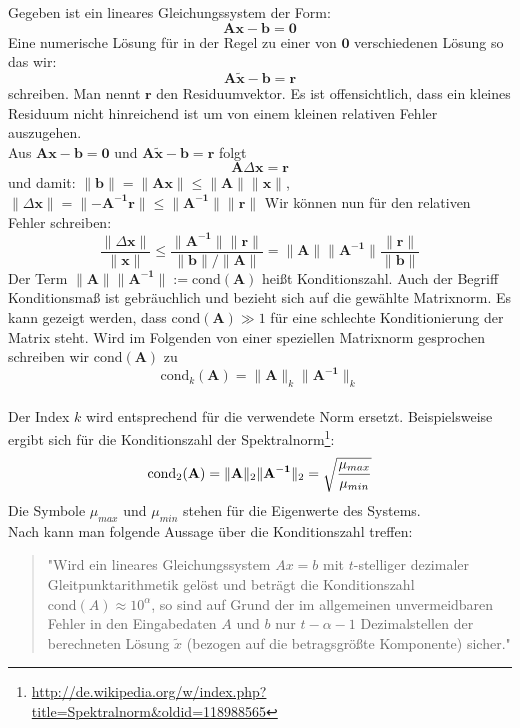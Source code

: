 %
Gegeben ist ein lineares Gleichungssystem der Form:
$$ \mathbf{A}\mathbf{x}-\mathbf{b} =\mathbf{0} $$
Eine numerische Lösung für in der Regel zu einer von $\mathbf{0}$ verschiedenen Lösung so das wir:
$$ \mathbf{A}\mathbf{\tilde{x}}-\mathbf{b} =\mathbf{r} $$
schreiben. Man nennt $\mathbf{r}$ den Residuumvektor. Es ist offensichtlich, dass ein kleines Residuum nicht hinreichend ist um von einem kleinen relativen Fehler auszugehen.\\
Aus $\mathbf{A}\mathbf{x}-\mathbf{b} =\mathbf{0}$ und $\mathbf{A}\mathbf{\tilde{x}}-\mathbf{b} =\mathbf{r}$ folgt $$ \mathbf{A}\Delta\mathbf{x}=\mathbf{r}$$
und damit:
$ 
\lVert \mathbf{b} \rVert=\lVert \mathbf{Ax} \rVert \leq \lVert \mathbf{A} \rVert \lVert \mathbf{x} \rVert
$, 
$
\lVert \Delta\mathbf{x} \rVert=\lVert -\mathbf{A^{-1}r} \rVert \leq \lVert \mathbf{A^{-1}} \rVert \lVert \mathbf{r} \rVert
$
Wir können nun für den relativen Fehler schreiben:
$$
\frac{\lVert \Delta\mathbf{x} \rVert}{\lVert \mathbf{x} \rVert} \leq 
\frac{\lVert \mathbf{A^{-1}} \rVert \lVert \mathbf{r} \rVert}{\lVert \mathbf{b} \rVert / \lVert \mathbf{A} \rVert} =
\lVert \mathbf{A} \rVert \lVert \mathbf{A^{-1}} \rVert \frac{\lVert \mathbf{r} \rVert}{\lVert \mathbf{b} \rVert}
$$
Der Term $\lVert \mathbf{A} \rVert \lVert \mathbf{A^{-1}} \rVert := \text{cond}(\mathbf{A})$ heißt Konditionszahl. Auch der Begriff Konditionsmaß ist gebräuchlich und bezieht sich auf die gewählte Matrixnorm.
Es kann gezeigt werden, dass $\text{cond}(\mathbf{A}) \gg 1$  für eine schlechte Konditionierung der Matrix steht. Wird im Folgenden von einer speziellen Matrixnorm gesprochen schreiben wir $\text{cond}(\mathbf{A})$ zu 
$$ 
\text{cond}_k(\mathbf{A}) = \lVert \mathbf{A} \rVert_k \lVert \mathbf{A^{-1}} \rVert_k
$$ \\
Der Index $k$ wird entsprechend für die verwendete Norm ersetzt. Beispielsweise ergibt sich für die Konditionszahl der Spektralnorm\footnote{\url{http://de.wikipedia.org/w/index.php?title=Spektralnorm&oldid=118988565}}:
$$ 
\text{cond}_2(\mathbf{A}) = \lVert \mathbf{A} \rVert_2 \lVert \mathbf{A^{-1}} \rVert_2=
\sqrt{\frac{\mu_{max}}{\mu_{min}}}\\
$$
Die Symbole $\mu_{max}$ und $\mu_{min}$ stehen für die Eigenwerte des Systems.\\
Nach \cite{hermann2001numerische} kann man folgende Aussage über die Konditionszahl treffen:
%
\begin{quote}
"Wird ein lineares Gleichungssystem $Ax=b$ mit $t$-stelliger dezimaler Gleitpunktarithmetik gelöst und beträgt die Konditionszahl $\text{cond}(A) \approx10^\alpha$, so sind auf Grund der im allgemeinen unvermeidbaren Fehler in den Eingabedaten $A$ und $b$ nur $t-\alpha-1$ Dezimalstellen der berechneten Lösung $\tilde{x}$ (bezogen auf die betragsgrößte Komponente) sicher."
\end{quote}